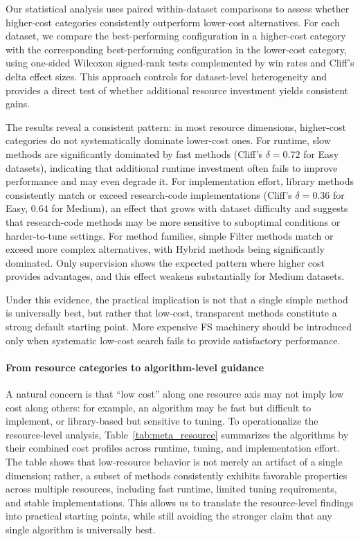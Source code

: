 \documentclass[preprint,12pt,authoryear]{elsarticle}
\begin{document}
Our statistical analysis uses paired within-dataset comparisons to assess whether higher-cost categories consistently outperform lower-cost alternatives. For each dataset, we compare the best-performing configuration in a higher-cost category with the corresponding best-performing configuration in the lower-cost category, using one-sided Wilcoxon signed-rank tests complemented by win rates and Cliff's delta effect sizes. This approach controls for dataset-level heterogeneity and provides a direct test of whether additional resource investment yields consistent gains.

The results reveal a consistent pattern: in most resource dimensions, higher-cost categories do not systematically dominate lower-cost ones. For runtime, slow methods are significantly dominated by fast methods (Cliff's $\delta = 0.72$ for Easy datasets), indicating that additional runtime investment often fails to improve performance and may even degrade it. For implementation effort, library methods consistently match or exceed research-code implementations (Cliff's $\delta = 0.36$ for Easy, $0.64$ for Medium), an effect that grows with dataset difficulty and suggests that research-code methods may be more sensitive to suboptimal conditions or harder-to-tune settings. For method families, simple Filter methods match or exceed more complex alternatives, with Hybrid methods being significantly dominated. Only supervision shows the expected pattern where higher cost provides advantages, and this effect weakens substantially for Medium datasets.

Under this evidence, the practical implication is not that a single simple method is universally best, but rather that low-cost, transparent methods constitute a strong default starting point. More expensive FS machinery should be introduced only when systematic low-cost search fails to provide satisfactory performance.

\paragraph{From resource categories to algorithm-level guidance}
A natural concern is that ``low cost'' along one resource axis may not imply low cost along others: for example, an algorithm may be fast but difficult to implement, or library-based but sensitive to tuning. To operationalize the resource-level analysis, Table~\ref{tab:meta_resource} summarizes the algorithms by their combined cost profiles across runtime, tuning, and implementation effort. The table shows that low-resource behavior is not merely an artifact of a single dimension; rather, a subset of methods consistently exhibits favorable properties across multiple resources, including fast runtime, limited tuning requirements, and stable implementations. This allows us to translate the resource-level findings into practical starting points, while still avoiding the stronger claim that any single algorithm is universally best.
\end{document}
